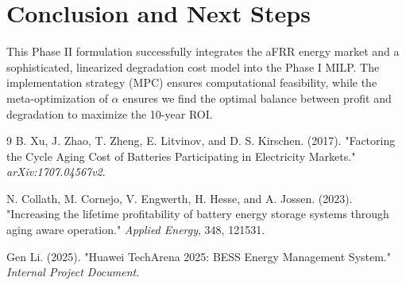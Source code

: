 \documentclass[11pt, a4paper]{article}
\begin{document}
\section{Conclusion and Next Steps}
This Phase II formulation successfully integrates the aFRR energy market and a sophisticated, linearized degradation cost model into the Phase I MILP. The implementation strategy (MPC) ensures computational feasibility, while the meta-optimization of $\alpha$ ensures we find the optimal balance between profit and degradation to maximize the 10-year ROI.

\begin{thebibliography}{9}
B. Xu, J. Zhao, T. Zheng, E. Litvinov, and D. S. Kirschen. (2017). "Factoring the Cycle Aging Cost of Batteries Participating in Electricity Markets." \textit{arXiv:1707.04567v2}.

N. Collath, M. Cornejo, V. Engwerth, H. Hesse, and A. Jossen. (2023). "Increasing the lifetime profitability of battery energy storage systems through aging aware operation." \textit{Applied Energy}, 348, 121531.

Gen Li. (2025). "Huawei TechArena 2025: BESS Energy Management System." \textit{Internal Project Document}.
\end{thebibliography}
\end{document}

